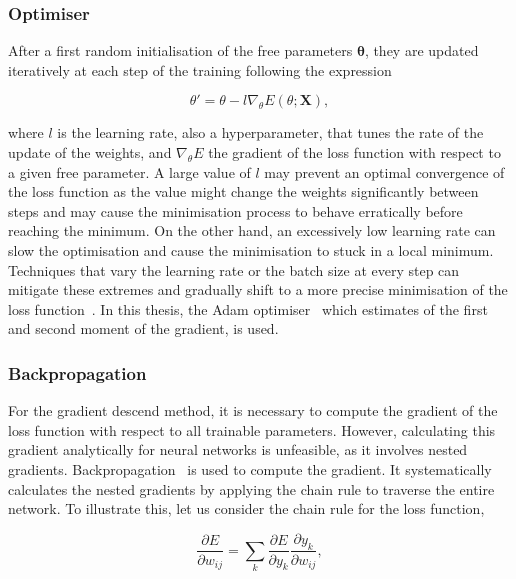 \subsubsection{Optimiser}

After a first random initialisation of the free parameters $\boldsymbol{\theta}$, they are updated iteratively at each step of the training following the expression

\begin{equation}
    \theta' = \theta - l \nabla_\theta E(\theta;\mathbf{X}),
\end{equation}

where $l$ is the learning rate, also a hyperparameter, that tunes the rate of the update of the weights, and $\nabla_\theta E$ the gradient of the loss function with respect to a given free parameter. A large value of $l$ may prevent an optimal convergence of the loss function as the value might change the weights significantly between steps and may cause the minimisation process to behave erratically before reaching the minimum. On the other hand, an excessively low learning rate can slow the optimisation and cause the minimisation to stuck in a local minimum. Techniques that vary the learning rate or the batch size at every step can mitigate these extremes and gradually shift to a more precise minimisation of the loss function~\cite{LRBatchSize}. In this thesis, the Adam optimiser~\cite{Kingma2015AdamAM} which estimates of the first and second moment of the gradient, is used.

\subsubsection{Backpropagation}

For the gradient descend method, it is necessary to compute the gradient of the loss function with respect to all trainable parameters. However, calculating this gradient analytically for neural networks is unfeasible, as it involves nested gradients. Backpropagation~\cite{Rumelhart1986} is used to compute the gradient. It systematically calculates the nested gradients by applying the chain rule to traverse the entire network. To illustrate this, let us consider the chain rule for the loss function,

\begin{equation}
    \frac{\partial E}{\partial w_{ij}} = \sum_k \frac{\partial E}{\partial y_k} \frac{\partial y_k}{\partial w_{ij}},
\end{equation}

